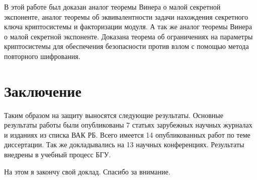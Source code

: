 \documentclass[a4paper,12pt]{article} %
\begin{document}
В этой работе был доказан аналог теоремы Винера о малой секретной экспоненте, аналог теоремы об эквивалентности задачи нахождения секретного ключа криптосистемы и факторизации модуля.
А так же аналог теоремы Винера о малой секретной экспоненте.
Доказана теорема об ограничениях на параметры криптосистемы для обеспечения безопасности против взлом с помощью метода повторного шифрования.

\section{Заключение}

Таким образом на защиту выносятся следующие результаты.
Основные результаты работы были опубликованы 7 статьях зарубежных научных журналах и изданиях из списка ВАК РБ.
Всего имеется 14 опубликованных работ по теме диссертации.
Так же докладывались на 13 научных конференциях.
Результаты внедрены в учебный процесс БГУ.

На этом я закончу свой доклад.
Спасибо за внимание.
\end{document}
